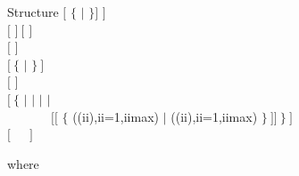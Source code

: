 \begin{DataStructure}{Structure }
  $[$  $\{$  $|$  $\}$$]$ $]$ \\
$[$  $]~[$  $]$ \\
$[$   $]$ \\
$[~\{$  $|$  $\}~]$ \\
$[$   $]$ \\
$[~\{$  $|$  $|$  $|$  $|$\\
~~~~~~~$[[$   $\{$  ((ii),ii=1,iimax)  $|$  ((ii),ii=1,iimax)   $\}~]]~\}~]$ \\
$[$~~~$]$
\end{DataStructure}

\noindent where

